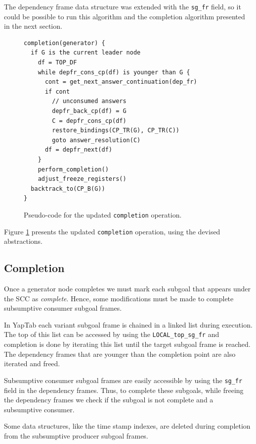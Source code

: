 The dependency frame data structure was extended with the \texttt{sg\_fr} field, so it could
be possible to run this algorithm and the completion algorithm presented in the next section.

\begin{figure}[ht]
\begin{Verbatim}
completion(generator) {
  if G is the current leader node
    df = TOP_DF
    while depfr_cons_cp(df) is younger than G {
      cont = get_next_answer_continuation(dep_fr)
      if cont
        // unconsumed answers
        depfr_back_cp(df) = G
        C = depfr_cons_cp(df)
        restore_bindings(CP_TR(G), CP_TR(C))
        goto answer_resolution(C)
      df = depfr_next(df)
    }
    perform_completion()
    adjust_freeze_registers()
  backtrack_to(CP_B(G))
}
\end{Verbatim}
\caption{Pseudo-code for the updated \texttt{completion} operation.}
\label{fig:completion_operation}
\end{figure}

Figure \ref{fig:completion_operation} presents the updated \texttt{completion} operation,
using the devised abstractions.

\subsection{Completion}

Once a generator node completes we must mark each subgoal that appears under the SCC as \textit{complete}.
Hence, some modifications must be made to complete subsumptive consumer subgoal frames.

In YapTab each variant subgoal frame is chained in a linked list during execution. The top of this list
can be accessed by using the \texttt{LOCAL\_top\_sg\_fr} and completion is done by iterating this list until
the target subgoal frame is reached. The dependency frames that are younger than the completion point
are also iterated and freed. 

Subsumptive consumer subgoal frames are easily accessible by using the \texttt{sg\_fr} field in the dependency frames.
Thus, to complete these subgoals, while freeing the dependency frames we check if the subgoal is not complete and a
subsumptive consumer.

Some data structures, like the time stamp indexes, are deleted during completion from the
subsumptive producer subgoal frames.

